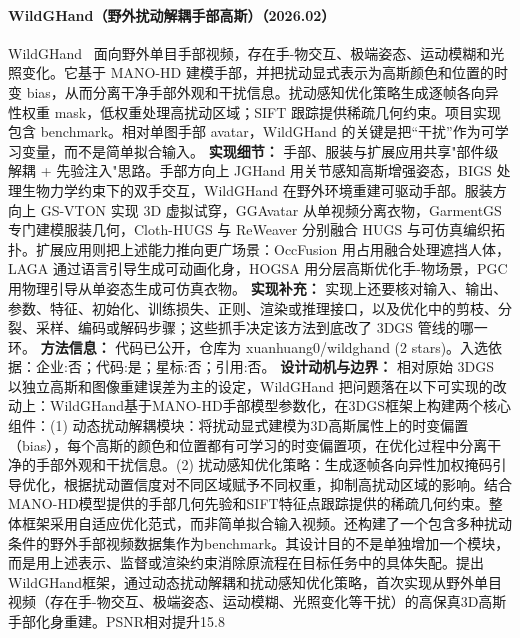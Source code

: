 \paragraph{WildGHand（野外扰动解耦手部高斯）（2026.02）}
WildGHand~\cite{2602_20556} 面向野外单目手部视频，存在手-物交互、极端姿态、运动模糊和光照变化。它基于 MANO-HD 建模手部，并把扰动显式表示为高斯颜色和位置的时变 bias，从而分离干净手部外观和干扰信息。扰动感知优化策略生成逐帧各向异性权重 mask，低权重处理高扰动区域；SIFT 跟踪提供稀疏几何约束。项目实现包含 benchmark。相对单图手部 avatar，WildGHand 的关键是把“干扰”作为可学习变量，而不是简单拟合输入。
\textbf{实现细节：} 手部、服装与扩展应用共享"部件级解耦 + 先验注入"思路。手部方向上 JGHand 用关节感知高斯增强姿态，BIGS 处理生物力学约束下的双手交互，WildGHand 在野外环境重建可驱动手部。服装方向上 GS-VTON 实现 3D 虚拟试穿，GGAvatar 从单视频分离衣物，GarmentGS 专门建模服装几何，Cloth-HUGS 与 ReWeaver 分别融合 HUGS 与可仿真编织拓扑。扩展应用则把上述能力推向更广场景：OccFusion 用占用融合处理遮挡人体，LAGA 通过语言引导生成可动画化身，HOGSA 用分层高斯优化手-物场景，PGC 用物理引导从单姿态生成可仿真衣物。
\textbf{实现补充：} 实现上还要核对输入、输出、参数、特征、初始化、训练损失、正则、渲染或推理接口，以及优化中的剪枝、分裂、采样、编码或解码步骤；这些抓手决定该方法到底改了 3DGS 管线的哪一环。
\textbf{方法信息：} 代码已公开，仓库为 xuanhuang0/wildghand (2 stars)。入选依据：企业:否；代码:是；星标:否；引用:否。
\textbf{设计动机与边界：} 相对原始 3DGS 以独立高斯和图像重建误差为主的设定，WildGHand 把问题落在以下可实现的改动上：WildGHand基于MANO-HD手部模型参数化，在3DGS框架上构建两个核心组件：(1) 动态扰动解耦模块：将扰动显式建模为3D高斯属性上的时变偏置（bias），每个高斯的颜色和位置都有可学习的时变偏置项，在优化过程中分离干净的手部外观和干扰信息。(2) 扰动感知优化策略：生成逐帧各向异性加权掩码引导优化，根据扰动置信度对不同区域赋予不同权重，抑制高扰动区域的影响。结合MANO-HD模型提供的手部几何先验和SIFT特征点跟踪提供的稀疏几何约束。整体框架采用自适应优化范式，而非简单拟合输入视频。还构建了一个包含多种扰动条件的野外手部视频数据集作为benchmark。其设计目的不是单独增加一个模块，而是用上述表示、监督或渲染约束消除原流程在目标任务中的具体失配。提出WildGHand框架，通过动态扰动解耦和扰动感知优化策略，首次实现从野外单目视频（存在手-物交互、极端姿态、运动模糊、光照变化等干扰）的高保真3D高斯手部化身重建。PSNR相对提升15.8%

